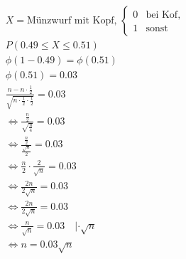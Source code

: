 \begin{align*}
    X = \text{Münzwurf mit Kopf, } \begin{cases}
                                       0 & \text{bei Kof, } \\
                                       1 & \text{sonst}
                                   \end{cases} \\
    P(0.49 \leq X \leq 0.51)                            \\
    \phi(1 - 0.49) = \phi(0.51)                         \\
    \phi(0.51) = 0.03                                   \\
    \frac{n - n \cdot \frac{1}{2}}{\sqrt{n \cdot \frac{1}{2} \cdot \frac{1}{2}}} = 0.03\\
    \Leftrightarrow \frac{\frac{n}{2}}{\sqrt{\frac{n}{4}}} = 0.03 \\
    \Leftrightarrow \frac{\frac{n}{2}}{\frac{\sqrt{n}}{2}} = 0.03 \\
    \Leftrightarrow \frac{n}{2} \cdot \frac{2}{\sqrt{n}} = 0.03 \\
    \Leftrightarrow \frac{2n}{2\sqrt{n}} = 0.03 \\
    \Leftrightarrow \frac{2n}{2\sqrt{n}} = 0.03 \\
    \Leftrightarrow \frac{n}{\sqrt{n}} = 0.03 \quad | \cdot \sqrt{n} \\
    \Leftrightarrow n = 0.03\sqrt{n}\\
\end{align*}